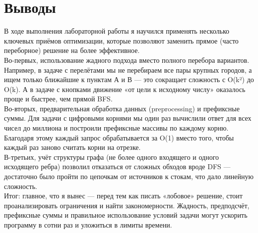 \documentclass[oneside,a4paper,14pt]{extarticle} %
\begin{document}
	\section*{Выводы}
	\noindent
	\indent В ходе выполнения лабораторной работы я научился применять несколько ключевых приёмов оптимизации, которые позволяют заменить прямое (часто переборное) решение на более эффективное. \\
	\indent Во-первых, использование жадного подхода вместо полного перебора вариантов. Например, в задаче с перелётами мы не перебираем все пары крупных городов, а ищем только ближайшие к пунктам А и В — это сокращает сложность с O(k²) до O(k). А в задаче с кнопками движение «от цели к исходному числу» оказалось проще и быстрее, чем прямой BFS. \\
	\indent Во-вторых, предварительная обработка данных (preprocessing) и префиксные суммы. Для задачи с цифровыми корнями мы один раз вычислили ответ для всех чисел до миллиона и построили префиксные массивы по каждому корню. Благодаря этому каждый запрос обрабатывается за O(1) вместо того, чтобы каждый раз заново считать корни на отрезке. \\
	\indent В-третьих, учёт структуры графа (не более одного входящего и одного исходящего ребра) позволил отказаться от сложных обходов вроде DFS — достаточно было пройти по цепочкам от источников к стокам, что дало линейную сложность. \\
	\indent Итог: главное, что я вынес — перед тем как писать «лобовое» решение, стоит проанализировать ограничения и найти закономерности. Жадность, предподсчёт, префиксные суммы и правильное использование условий задачи могут ускорить программу в сотни раз и уложиться в лимиты времени. \\
	
\end{document}
